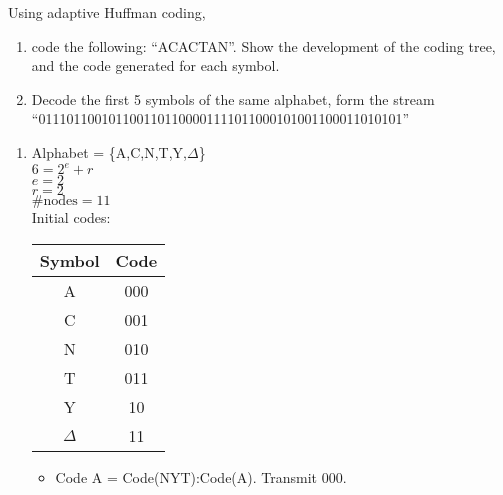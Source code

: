 \begin{question}
Using adaptive Huffman coding,
\begin{enumerate}
\item code the following: “ACACTAN”. Show the development of the coding tree, and the code generated for each symbol.
\item Decode the first 5 symbols of the same alphabet, form the stream
“0111011001011001101100001111011000101001100011010101”
\end{enumerate}
\end{question}
\begin{solution}
\begin{enumerate}
\item Alphabet = \{A,C,N,T,Y,$\Delta$\} \\
$6=2^e + r$ \\
$e=2$ \\
$r=2$ \\
$\text{\#nodes}= 11$ \\
Initial codes: \\
\begin{tabular}{|c|c|}
\hline 
Symbol & Code \\ 
\hline 
A & 000 \\ 
\hline 
C & 001 \\ 
\hline 
N & 010 \\ 
\hline 
T & 011 \\ 
\hline 
Y & 10 \\ 
\hline 
$\Delta$ & 11 \\ 
\hline 
\end{tabular} 

\begin{itemize}
\item Code A = Code(NYT):Code(A). Transmit 000. \\



\end{itemize}
\end{enumerate}
\end{solution}
